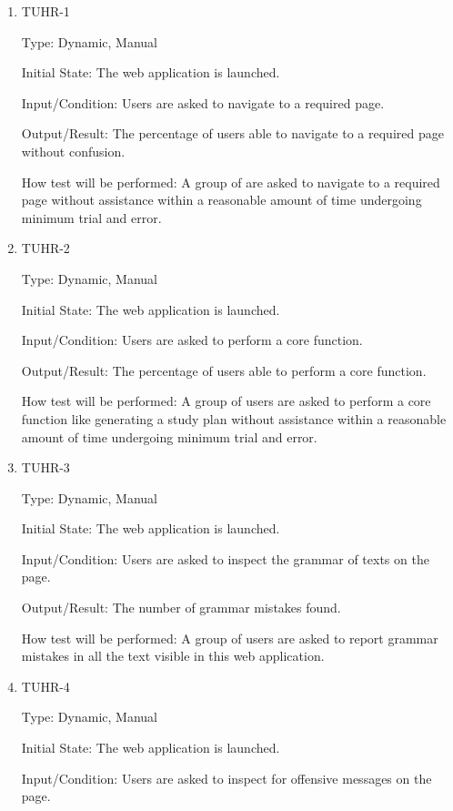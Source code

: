 \documentclass[12pt, titlepage]{article}
\begin{document}
\begin{enumerate}
\item{TUHR-1\\}

Type: Dynamic, Manual
					
Initial State: The web application is launched.
					
Input/Condition: Users are asked to navigate to a required page.
					
Output/Result: The percentage of users able to navigate to a required page without confusion.
					
How test will be performed: A group of are asked to navigate to a required page without assistance within a reasonable amount of time undergoing minimum trial and error.

\item{TUHR-2\\}

Type: Dynamic, Manual
					
Initial State: The web application is launched.
					
Input/Condition: Users are asked to perform a core function.
					
Output/Result: The percentage of users able to perform a core function.
					
How test will be performed: A group of users are asked to perform a core function like generating a study plan without assistance within a reasonable amount of time undergoing minimum trial and error.
\item{TUHR-3\\}

Type: Dynamic, Manual
					
Initial State: The web application is launched.
					
Input/Condition: Users are asked to inspect the grammar of texts on the page.
					
Output/Result: The number of grammar mistakes found.
					
How test will be performed: A group of users are asked to report grammar mistakes in all the text visible in this web application.

\item{TUHR-4\\}

Type: Dynamic, Manual
					
Initial State: The web application is launched.
					
Input/Condition: Users are asked to inspect for offensive messages on the page.
					

\end{enumerate}
\end{document}
